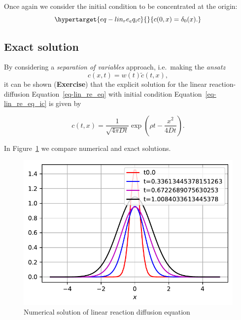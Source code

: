 \documentclass[
  letterpaper,
  DIV=11,
  numbers=noendperiod]{scrreprt}
\theoremstyle{plain}
\theoremstyle{definition}
\theoremstyle{plain}
\theoremstyle{remark}
\begin{document}
Once again we consider the initial condition to be concentrated at the
origin: \begin{equation}\protect\hypertarget{eq-lin_re_eq_ic}{}{
c(0,x) = \delta_0(x).
}\label{eq-lin_re_eq_ic}\end{equation}

\hypertarget{exact-solution}{%
\subsection{Exact solution}\label{exact-solution}}

By considering a \emph{separation of variables} approach, i.e.~making
the \emph{ansatz} \[
c(x,t) = w(t) \tilde c(t,x),
\] it can be shown (\textbf{Exercise}) that the explicit solution for
the linear reaction-diffusion Equation~\ref{eq-lin_re_eq} with initial
condition Equation~\ref{eq-lin_re_eq_ic} is given by

\[
c(t,x) = \frac1{\sqrt{4 \pi D t}} \exp \left(\rho t - \frac{x^2}{ 4Dt} \right).
\]

In Figure~\ref{fig-diffusionlinearsource} we compare numerical and exact
solutions.

\begin{figure}

{\centering \includegraphics{linearreactiondiffusion_files/figure-pdf/fig-diffusionlinearsource-output-1.pdf}

}

\caption{\label{fig-diffusionlinearsource}Numerical solution of linear
reaction diffusion equation}

\end{figure}
\end{document}
